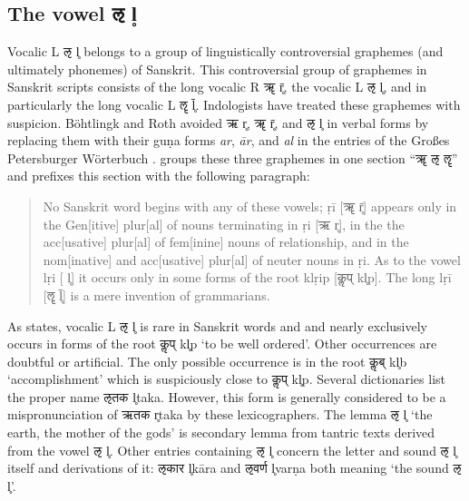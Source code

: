 \subsection{The vowel {\devhmfont ऌ} l̥}

Vocalic L {\devfont ऌ} l̥  belongs to a group of linguistically controversial graphemes (and ultimately phonemes) of Sanskrit. This controversial group of graphemes in Sanskrit scripts consists of the long vocalic R {\devfont ॠ} r̥̄, the vocalic L {\devfont ऌ} l̥, and in particularly the long vocalic L {\devfont ॡ} l̥̄. Indologists have treated these graphemes with suspicion. Böhtlingk and Roth avoided  {\devfont ऋ} r̥, {\devfont ॠ} r̥̄, and {\devfont ऌ} l̥ in verbal forms by replacing them with their guṇa forms \emph{ar}, \emph{ār}, and \emph{al} in the entries of the Großes Petersburger Wörterbuch \citep{pwg}. \citet{mw72} groups these three graphemes in one section “{\devfont ॠ} {\devfont ऌ} {\devfont ॡ}” and prefixes this section with the following paragraph:

\begin{quote}
No Sanskrit word begins with any of these vowels; ṛī [{\devfont ॠ} r̥̄] appears only in the Gen[itive] plur[al] of nouns terminating in ṛi [{\devfont ऋ} r̥], in the the acc[usative] plur[al] of fem[inine] nouns of relationship, and in the nom[inative] and acc[usative] plur[al] of neuter nouns in ṛi. As to the vowel lṛi [{} l̥] it occurs only in some forms of the root klṛip [{\devfont कॢप्} kl̥p]. The long lṛī [{\devfont ॡ} l̥̄] is a mere invention of grammarians.	
\end{quote}


As \citet{mw} states, vocalic L {\devfont ऌ} l̥ is rare in Sanskrit words and and nearly exclusively occurs in forms of the root {\devfont कॢप्} kl̥p ‘to be well ordered’. Other occurrences are doubtful or artificial. The only possible occurrence is in the root {\devfont कॢब्} kl̥b ‘accomplishment’ which is suspiciously close to  {\devfont कॢप्} kl̥p. Several dictionaries list the proper name {\devfont ऌतक} l̥taka. However, this form is generally considered to be a mispronunciation of {\devfont ऋतक} r̥taka by these lexicographers. The lemma {\devfont ऌ} l̥ ‘the earth, the mother of the gods’ is secondary lemma from tantric texts derived from the vowel  {\devfont ऌ} l̥. Other entries containing {\devfont ऌ} l̥ concern the letter and sound {\devfont ऌ} l̥ itself and derivations of it: {\devfont ऌकार} l̥kāra and {\devfont ऌवर्ण} l̥varṇa both meaning ‘the sound {\devfont ऌ} l̥’.

